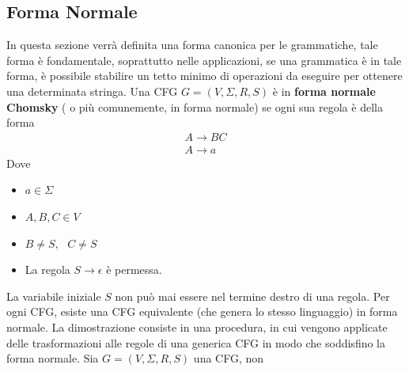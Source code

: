\documentclass[10pt, letterpaper]{report}
\begin{document}
\subsection{Forma Normale}
In questa sezione verrà definita una forma canonica per le grammatiche, tale forma è fondamentale, soprattutto nelle applicazioni, 
se una grammatica è in tale forma, è possibile stabilire un tetto minimo di operazioni da eseguire per ottenere una 
determinata stringa.\acc 
{} Una CFG $G=(V,\Sigma, R, S)$ è in \textbf{forma normale Chomsky} ( o più comunemente, in forma normale) se ogni sua 
regola è della forma $$\begin{matrix}
    A\longrightarrow BC \\ 
    A \longrightarrow a
\end{matrix} $$
Dove \begin{itemize}
    \item $a\in\Sigma$
    \item $A,B,C \in V$
    \item $B\ne S, \ \ \ C\ne S$
    \item La regola $S\longrightarrow\epsilon$ è permessa.
\end{itemize}
La variabile iniziale $S$ non può mai essere nel termine destro di una regola.\acc 
\teo{} Per ogni CFG, esiste una CFG equivalente (che genera lo stesso linguaggio) in forma normale.\acc 
\dimo{} La dimostrazione consiste in una procedura, in cui vengono applicate delle trasformazioni alle regole di una 
generica CFG in modo che soddisfino la forma normale. Sia $G=(V,\Sigma, R, S)$ una CFG, non 
\end{document}
